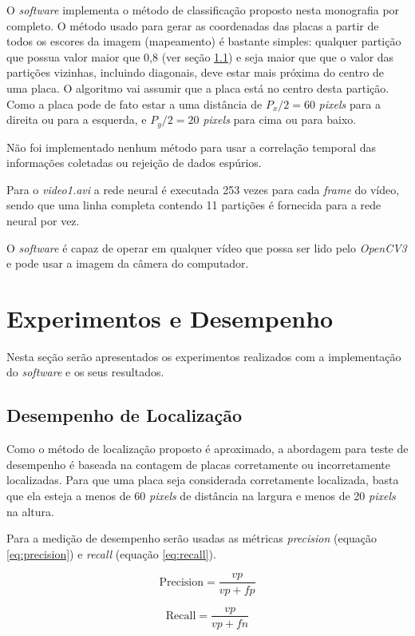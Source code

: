 O \emph{software} implementa o método de classificação proposto nesta
monografia por completo. O método usado para gerar as coordenadas das placas a
partir de todos os escores da imagem (mapeamento) é bastante simples: qualquer
partição que possua valor maior que 0,8 (ver seção \ref{sec:desemp_loc})
e seja maior que que o valor das
partições vizinhas, incluindo diagonais, deve estar mais próxima do centro de
uma placa. O algoritmo vai assumir que a placa está no centro desta partição.
Como a placa pode de fato estar a uma distância de $P_x/2=60$ \emph{pixels}
para a direita ou para a esquerda, e $P_y/2=20$ \emph{pixels} para cima ou para
baixo.

Não foi implementado nenhum método para usar a correlação temporal das
informações coletadas ou rejeição de dados espúrios.

Para o \emph{video1.avi} a rede neural é executada 253 vezes para
cada \emph{frame}
do vídeo, sendo que uma linha completa contendo 11 partições é fornecida para a
rede neural por vez.

O \emph{software} é capaz de operar em qualquer vídeo que possa ser lido pelo
\emph{OpenCV3} e pode usar a imagem da câmera do computador.

\section{Experimentos e Desempenho}

Nesta seção serão apresentados os experimentos realizados com a implementação
do \emph{software} e os seus resultados.

\subsection{Desempenho de Localização} \label{sec:desemp_loc}

Como o método de localização proposto é aproximado, a abordagem para teste de
desempenho é baseada na contagem de placas corretamente ou
incorretamente localizadas. Para que uma placa seja considerada corretamente
localizada, basta que ela esteja a menos de 60 \emph{pixels} de distância na
largura e menos de 20 \emph{pixels} na altura.
	
Para a medição de desempenho serão usadas as métricas \emph{precision}
(equação \ref{eq:precision}) e \emph{recall} (equação \ref{eq:recall}).

\noindent\begin{minipage}{.5\linewidth}
	\begin{equation} \label{eq:precision}
		\text{Precision} = \frac{vp}{vp + fp}
	\end{equation}
\end{minipage}
\begin{minipage}{.5\linewidth}
	\begin{equation} \label{eq:recall}
		\text{Recall} = \frac{vp}{vp + fn}
	\end{equation}
\end{minipage}

